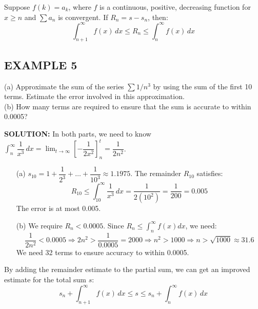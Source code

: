 \documentclass{article}
\begin{document}
\begin{tcolorbox}[
    colback=white,
    colframe=orange!80!white,
    title=Remainder Estimate for the Integral Test,
    boxrule=0.5mm,
    arc=3mm
    ]
    Suppose \(f(k) = a_k\), where \(f\) is a continuous, positive, decreasing function for \(x \ge n\) and \( \sum a_n \) is convergent. If \(R_n = s - s_n\), then:
    \[ \int_{n+1}^\infty f(x) \,dx \le R_n \le \int_n^\infty f(x) \,dx \]
\end{tcolorbox}

\subsection*{EXAMPLE 5}
(a) Approximate the sum of the series \( \sum 1/n^3 \) by using the sum of the first 10 terms. Estimate the error involved in this approximation. \\
(b) How many terms are required to ensure that the sum is accurate to within 0.0005?

\textbf{SOLUTION:}
In both parts, we need to know \( \int_n^\infty \dfrac{1}{x^3} \,dx = \lim_{t\to\infty} \left[ -\dfrac{1}{2x^2} \right]_n^t = \dfrac{1}{2n^2} \).
\begin{itemize}
    \item[(a)] \( s_{10} = 1 + \dfrac{1}{2^3} + \dots + \dfrac{1}{10^3} \approx 1.1975 \). The remainder \(R_{10}\) satisfies:
    \[ R_{10} \le \int_{10}^\infty \dfrac{1}{x^3} \,dx = \dfrac{1}{2(10^2)} = \dfrac{1}{200} = 0.005 \]
    The error is at most 0.005.
    \item[(b)] We require \(R_n < 0.0005\). Since \(R_n \le \int_n^\infty f(x) dx\), we need:
    \[ \dfrac{1}{2n^2} < 0.0005 \Rightarrow 2n^2 > \dfrac{1}{0.0005} = 2000 \Rightarrow n^2 > 1000 \Rightarrow n > \sqrt{1000} \approx 31.6 \]
    We need 32 terms to ensure accuracy to within 0.0005.
\end{itemize}

By adding the remainder estimate to the partial sum, we can get an improved estimate for the total sum \(s\):
\[ s_n + \int_{n+1}^\infty f(x) \,dx \le s \le s_n + \int_n^\infty f(x) \,dx \]
\end{document}
